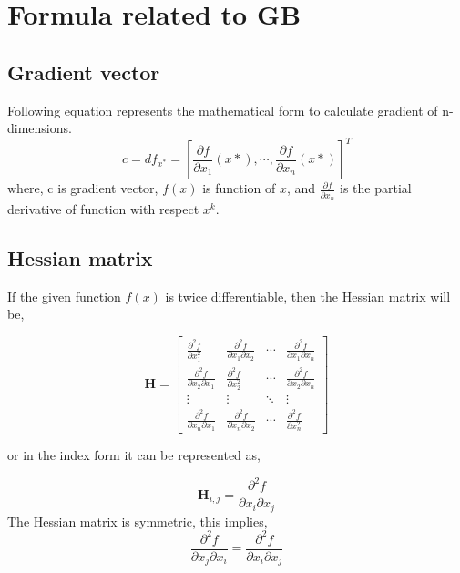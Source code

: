 \chapter{ Formula related to GB}
\label{chap:app_a}
\section{Gradient vector}
Following equation represents the mathematical form to calculate gradient of n-dimensions.
\begin{equation}
c = d f_{x^*}={\left[\frac{\partial f}{\partial x_{1}}(x*),  \cdots ,\frac{\partial f}{\partial x_{n}}(x*)\right]}^T
\label{gradient_vector}
\end{equation}
where, c is gradient vector, $f(x)$ is function of $x$, and $\frac{\partial f}{\partial x_{n}}$ is the partial derivative of function with respect $x^k$.

\section{Hessian matrix}
If the given function $f(x)$ is twice differentiable, then the Hessian matrix will be,

\begin{equation}
\mathbf{H}=\left[\begin{array}{cccc}
\frac{\partial^{2} f}{\partial x_{1}^{2}} & \frac{\partial^{2} f}{\partial x_{1} \partial x_{2}} & \cdots & \frac{\partial^{2} f}{\partial x_{1} \partial x_{n}} \\
\frac{\partial^{2} f}{\partial x_{2} \partial x_{1}} & \frac{\partial^{2} f}{\partial x_{2}^{2}} & \cdots & \frac{\partial^{2} f}{\partial x_{2} \partial x_{n}} \\
\vdots & \vdots & \ddots & \vdots \\
\frac{\partial^{2} f}{\partial x_{n} \partial x_{1}} & \frac{\partial^{2} f}{\partial x_{n} \partial x_{2}} & \cdots & \frac{\partial^{2} f}{\partial x_{n}^{2}}
\end{array}\right]
\label{Hessian_matrix}
\end{equation}

or in the index form it can be represented as,

\begin{equation}
\mathbf{H}_{i, j}=\frac{\partial^{2} f}{\partial x_{i} \partial x_{j}}
\end{equation}
The Hessian matrix is symmetric, this implies,
 \begin{equation}
\frac{\partial^{2} f}{\partial x_{j} \partial x_{i}}=\frac{\partial^{2} f}{\partial x_{i} \partial x_{j}}
\end{equation}

